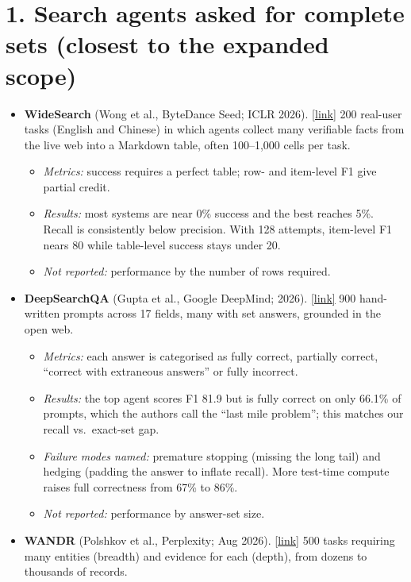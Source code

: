 \documentclass[10pt]{article}
\newcommand{\paper}[3]{\textbf{#1} \textnormal{(#2)}. \href{#3}{\small[link]}}
\begin{document}
\section*{1. Search agents asked for complete sets (closest to the expanded scope)}
\begin{itemize}
\item \paper{WideSearch}{Wong et al., ByteDance Seed; ICLR 2026}{https://arxiv.org/abs/2508.07999}
200 real-user tasks (English and Chinese) in which agents collect many verifiable facts from the live web into a
Markdown table, often 100--1,000 cells per task.
  \begin{itemize}
  \item \emph{Metrics:} success requires a perfect table; row- and item-level F1 give partial credit.
  \item \emph{Results:} most systems are near 0\% success and the best reaches 5\%. Recall is consistently below
  precision. With 128 attempts, item-level F1 nears 80 while table-level success stays under 20.
  \item \emph{Not reported:} performance by the number of rows required.
  \end{itemize}
\item \paper{DeepSearchQA}{Gupta et al., Google DeepMind; 2026}{https://arxiv.org/abs/2601.20975}
900 hand-written prompts across 17 fields, many with set answers, grounded in the open web.
  \begin{itemize}
  \item \emph{Metrics:} each answer is categorised as fully correct, partially correct, ``correct with extraneous
  answers'' or fully incorrect.
  \item \emph{Results:} the top agent scores F1 81.9 but is fully correct on only 66.1\% of prompts, which the
  authors call the ``last mile problem''; this matches our recall vs.\ exact-set gap.
  \item \emph{Failure modes named:} premature stopping (missing the long tail) and hedging (padding the answer to
  inflate recall). More test-time compute raises full correctness from 67\% to 86\%.
  \item \emph{Not reported:} performance by answer-set size.
  \end{itemize}
\item \paper{WANDR}{Polshkov et al., Perplexity; Aug 2026}{https://arxiv.org/abs/2608.14747}
500 tasks requiring many entities (breadth) and evidence for each (depth), from dozens to thousands of records.
  \begin{itemize}

\end{itemize}
\end{itemize}
\end{document}
